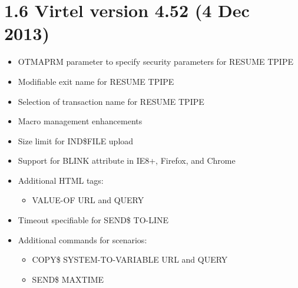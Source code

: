 \documentclass[letterpaper,10pt,english]{sphinxmanual}
\begin{document}
\section{1.6 Virtel version 4.52 (4 Dec 2013)}
\label{\detokenize{Installation_Guide:virtel-version-4-52-4-dec-2013}}
\begin{itemize}
\item {} 
OTMAPRM parameter to specify security parameters for RESUME TPIPE

\item {} 
Modifiable exit name for RESUME TPIPE

\item {} 
Selection of transaction name for RESUME TPIPE

\end{itemize}

\begin{itemize}
\item {} 
Macro management enhancements

\item {} 
Size limit for IND\$FILE upload

\item {} 
Support for BLINK attribute in IE8+, Firefox, and Chrome

\item {} 
Additional HTML tags:
\begin{itemize}
\item {} 
VALUE-OF URL and QUERY

\end{itemize}

\end{itemize}

\begin{itemize}
\item {} 
Timeout specifiable for SEND\$ TO-LINE

\item {} 
Additional commands for scenarios:
\begin{itemize}
\item {} 
COPY\$ SYSTEM-TO-VARIABLE URL and QUERY

\item {} 
SEND\$ MAXTIME

\end{itemize}

\end{itemize}
\end{document}
